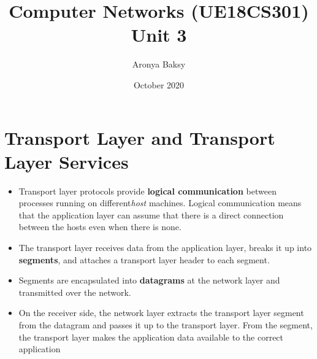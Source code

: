 \documentclass{article}
\title{Computer Networks (UE18CS301)\\
 \large Unit 3
 }
\author{Aronya Baksy}
\date{October 2020}
\theoremstyle{plain}
\theoremstyle{definition}
\begin{document}
\maketitle

\section{Transport Layer and Transport Layer Services}
\begin{itemize}
    \item Transport layer protocols provide \textbf{logical communication} between processes running on different\textit{host} machines. Logical communication means that the application layer can assume that there is a direct connection between the hosts even when there is none.
    
    \item The transport layer receives data from the application layer, breaks it up into \textbf{segments}, and attaches a transport layer header to each segment. 
    
    \item Segments are encapsulated into \textbf{datagrams} at the network layer and transmitted over the network. 
    
    \item On the receiver side, the network layer extracts the transport layer segment from the datagram and passes it up to the transport layer. From the segment, the transport layer makes the application data available to the correct application
\end{itemize}
\end{document}
